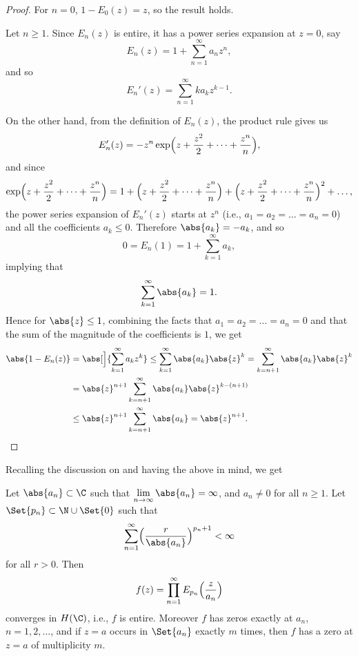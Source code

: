 \begin{proof}
	For $n = 0$, $1 - E_0(z) = z$, so the result holds.

	Let $n \geq 1$.
	Since $E_n(z)$ is entire, it has a power series expansion at $z = 0$, say
	\[
		E_n(z) = 1 + \sum_{n = 1}^\infty a_n z^n,
	\]
	and so
	\[
		E_n'(z) = \sum_{n = 1}^\infty k a_k z^{k - 1}.
	\]

	On the other hand, from the definition of $E_n(z)$, the product rule gives us
	\[
		E_n'(z) = -z^n \exp\Bigl ( z + \frac{z^2}{2} + \dots + \frac{z^n}{n} \Bigr ),
	\]
	and since
	\[
		\exp\Bigl ( z + \frac{z^2}{2} + \dots + \frac{z^n}{n} \Bigr ) = 1 + \Bigl ( z + \frac{z^2}{2} + \dots + \frac{z^n}{n} \Bigr ) + \Bigl ( z + \frac{z^2}{2} + \dots + \frac{z^n}{n} \Bigr )^2 + \dots,
	\]
	the power series expansion of $E_n'(z)$ starts at $z^n$ (i.e., $a_1 = a_2 = \dots = a_n = 0$) and all the coefficients $a_k \leq 0$.
	Therefore $\abs{a_k} = - a_k$, and so
	\[
		0 = E_n(1) = 1 + \sum_{k = 1}^\infty a_k,
	\]
	implying that
	\[
		\sum_{k = 1}^\infty \abs{a_k} = 1.
	\]
	Hence for $\abs{z} \leq 1$, combining the facts that $a_1 = a_2 = \dots = a_n = 0$ and that the sum of the magnitude of the coefficients is $1$, we get
	\begin{align*}
		\abs{1 - E_n(z)} &= \abs[\Big]{\sum_{k = 1}^\infty a_k z^k} \leq \sum_{k = 1}^\infty \abs{a_k} \abs{z}^k = \sum_{k = n + 1}^\infty \abs{a_k} \abs{z}^k \\
		&= \abs{z}^{n + 1} \sum_{k = n + 1}^\infty \abs{a_k} \abs{z}^{k - (n + 1)} \\
		&\leq \abs{z}^{n + 1} \sum_{k = n + 1}^\infty \abs{a_k} = \abs{z}^{n + 1}. \qedhere
	\end{align*}
\end{proof}

Recalling the discussion on  and having the above in mind, we get

\begin{theorem}\label{thm8.7}
	Let $\abs{a_n} \subset \C$ such that $\lim\limits_{n \to \infty} \abs{a_n} = \infty$, and $a_n \neq 0$ for all $n \geq 1$.
	Let $\Set{p_n} \subset \N \cup \Set{0}$ such that
	\begin{equation}\label{thm8.7growth}
		\sum_{n = 1}^\infty \Bigl( \frac{r}{\abs{a_n}} \Bigr)^{p_n + 1} < \infty
	\end{equation}
	for all $r > 0$.
	Then
	\[
		f(z) = \prod_{n = 1}^\infty E_{p_n} \Bigl( \frac{z}{a_n} \Bigr)
	\]
	converges in $H(\C)$, i.e., $f$ is entire.
	Moreover $f$ has zeros exactly at $a_n$, $n = 1, 2, \dots$, and if $z = a$ occurs in $\Set{a_n}$ exactly $m$ times, then $f$ has a zero at $z = a$ of multiplicity $m$.
\end{theorem}

